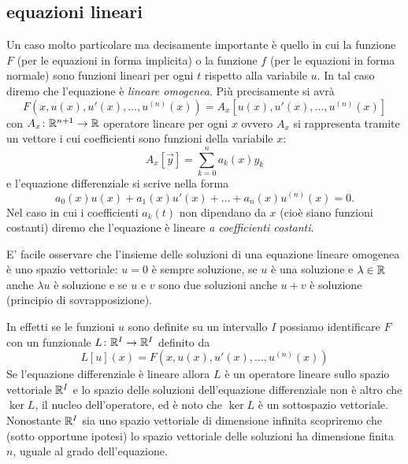 \subsection{equazioni lineari}

Un caso molto particolare ma decisamente importante è quello in cui la funzione
$F$ (per le equazioni in forma implicita) o la funzione $f$
(per le equazioni in forma normale) sono funzioni lineari
per ogni $t$
rispetto alla variabile $u$.
In tal caso diremo che l'equazione è
%
%
\emph{lineare omogenea}.
Più precisamente si avrà
\[
F(x,u(x),u'(x), \dots, u^{(n)}(x)) = A_x[u(x), u'(x), \dots, u^{(n)}(x)]
\]
con $A_x\colon {\mathbb R}^{n+1}\to {\mathbb R}$
operatore lineare per ogni $x$ ovvero $A_x$ si rappresenta tramite un vettore
i cui coefficienti sono funzioni della variabile $x$:
\[
  A_x[\vec y] = \sum_{k=0}^n a_k(x) y_k
\]
e l'equazione differenziale si scrive nella forma
\[
  a_0(x) u(x) + a_1(x) u'(x) + \dots + a_n(x) u^{(n)}(x) = 0.
\]
Nel caso in cui i coefficienti $a_k(t)$ non dipendano da $x$
(cioè siano funzioni costanti) diremo che l'equazione è
lineare
%
%
\emph{a coefficienti costanti}.

E' facile osservare che l'insieme delle soluzioni di una equazione lineare 
omogenea è uno spazio vettoriale: $u=0$ è sempre soluzione, 
se $u$ è una soluzione e $\lambda \in {\mathbb R}$ anche $\lambda u$ è soluzione 
e se $u$ e $v$ sono due soluzioni anche $u+v$ è soluzione
%
%
%
(principio di sovrapposizione).

In effetti
se le funzioni $u$ sono definite su un intervallo $I$ possiamo
identificare $F$ con un funzionale $L\colon {\mathbb R}^I \to {\mathbb R}^I$ definito da
\[
  L[u](x) = F(x,u(x), u'(x), \dots, u^{(n)}(x))
\]
Se l'equazione differenziale è lineare allora $L$ è un operatore lineare
sullo spazio vettoriale ${\mathbb R}^I$ e lo spazio delle soluzioni dell'equazione
differenziale non è altro che $\ker L$, il nucleo dell'operatore,
ed è noto che $\ker L$ è un sottospazio vettoriale.
Nonostante ${\mathbb R}^I$ sia uno spazio vettoriale di dimensione infinita scopriremo
che (sotto opportune ipotesi) lo spazio vettoriale delle soluzioni
ha dimensione finita $n$, uguale al grado dell'equazione.

